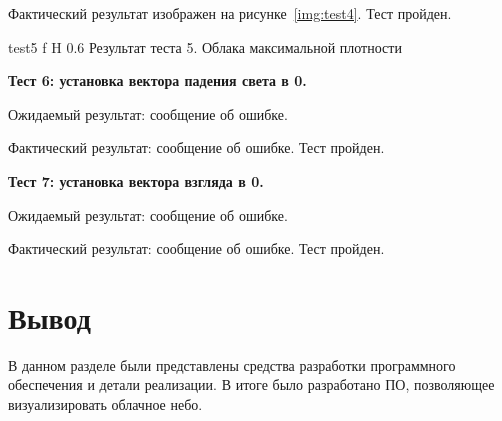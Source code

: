 Фактический результат изображен на рисунке~\ref{img:test4}. Тест пройден.

{test5} %
{f} %
{H} %
{0.6\textwidth} %
{Результат теста 5. Облака максимальной плотности} %


\textbf{Тест 6: установка вектора падения света в 0.}

Ожидаемый результат: сообщение об ошибке.

Фактический результат: сообщение об ошибке. Тест пройден.


\textbf{Тест 7: установка вектора взгляда в 0.}

Ожидаемый результат: сообщение об ошибке.

Фактический результат: сообщение об ошибке. Тест пройден.


\section*{Вывод}

В данном разделе были представлены средства разработки программного обеспечения и детали реализации. В итоге было разработано ПО, позволяющее визуализировать облачное небо.


